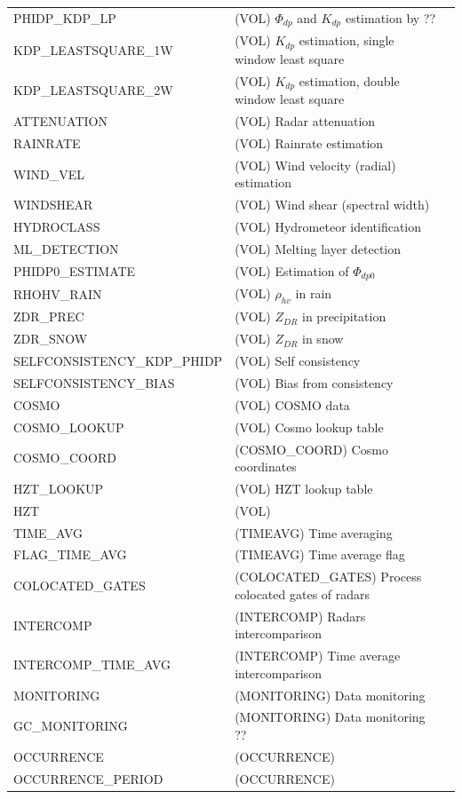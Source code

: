 \documentclass[a4paper,11pt,pdftex,twoside]{scrartcl}
\begin{document}
{{{\begin{longtable}{p{}p{}p{}}
PHIDP\_KDP\_LP & (VOL) $\Phi_{dp}$ and $K_{dp}$ estimation by ?? & \\
KDP\_LEASTSQUARE\_1W & (VOL) $K_{dp}$ estimation, single window least square & \\
KDP\_LEASTSQUARE\_2W & (VOL) $K_{dp}$ estimation, double window least square & \\
ATTENUATION & (VOL) Radar attenuation & \\
RAINRATE & (VOL) Rainrate estimation & \\
WIND\_VEL & (VOL) Wind velocity (radial) estimation & \\
WINDSHEAR & (VOL) Wind shear (spectral width) & \\
HYDROCLASS & (VOL) Hydrometeor identification & \\
ML\_DETECTION &  (VOL) Melting layer detection & \\
PHIDP0\_ESTIMATE &  (VOL) Estimation of $\Phi_{dp0}$ & \\
RHOHV\_RAIN & (VOL) $\rho_{hv}$ in rain & \\
ZDR\_PREC &  (VOL) $Z_{DR}$ in precipitation& \\
ZDR\_SNOW &  (VOL) $Z_{DR}$ in  snow & \\
SELFCONSISTENCY\_KDP\_PHIDP & (VOL) Self consistency & \\
SELFCONSISTENCY\_BIAS & (VOL) Bias from consistency & \\
COSMO & (VOL) COSMO data & \\
COSMO\_LOOKUP & (VOL) Cosmo lookup table & \\
COSMO\_COORD & (COSMO\_COORD) Cosmo coordinates & \\
HZT\_LOOKUP & (VOL) HZT lookup table & \\
HZT  & (VOL) & \\
TIME\_AVG & (TIMEAVG) Time averaging & \\
FLAG\_TIME\_AVG & (TIMEAVG) Time average flag& \\
COLOCATED\_GATES & (COLOCATED\_GATES) Process colocated gates of radars & \\
INTERCOMP & (INTERCOMP) Radars intercomparison & \\
INTERCOMP\_TIME\_AVG & (INTERCOMP) Time average intercomparison& \\
MONITORING & (MONITORING) Data monitoring & \\
GC\_MONITORING & (MONITORING) Data monitoring ?? & \\
OCCURRENCE & (OCCURRENCE) & \\
OCCURRENCE\_PERIOD & (OCCURRENCE) & \\

\end{longtable}}}}
\end{document}
